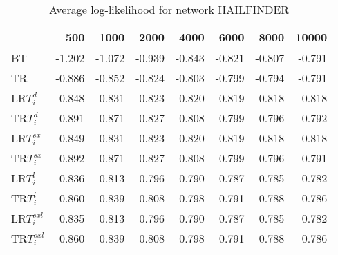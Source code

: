 \begin{table}
 \begin{center}
 \begin{tabular}{lrrrrrrr}
 & 500 & 1000 & 2000 & 4000 & 6000 & 8000 & 10000\\\hline
BT & -1.202 & -1.072 & -0.939 & -0.843 & -0.821 & -0.807 & -0.791\\\hline
TR & -0.886 & -0.852 & -0.824 & -0.803 & -0.799 & -0.794 & -0.791\\\hline
LR$T_i^d$ & -0.848 & -0.831 & -0.823 & -0.820 & -0.819 & -0.818 & -0.818\\\hline
TR$T_i^d$ & -0.891 & -0.871 & -0.827 & -0.808 & -0.799 & -0.796 & -0.792\\\hline
LR$T_i^{sx}$ & -0.849 & -0.831 & -0.823 & -0.820 & -0.819 & -0.818 & -0.818\\\hline
TR$T_i^{sx}$ & -0.892 & -0.871 & -0.827 & -0.808 & -0.799 & -0.796 & -0.791\\\hline
LR$T_i^l$ & -0.836 & -0.813 & -0.796 & -0.790 & -0.787 & -0.785 & -0.782\\\hline
TR$T_i^l$ & -0.860 & -0.839 & -0.808 & -0.798 & -0.791 & -0.788 & -0.786\\\hline
LR$T_i^{sxl}$ & -0.835 & -0.813 & -0.796 & -0.790 & -0.787 & -0.785 & -0.782\\\hline
TR$T_i^{sxl}$ & -0.860 & -0.839 & -0.808 & -0.798 & -0.791 & -0.788 & -0.786\\\hline
\end{tabular}
\end{center}
\caption{Average log-likelihood for network HAILFINDER }
\label{Hailfinderll}
\end{table}


